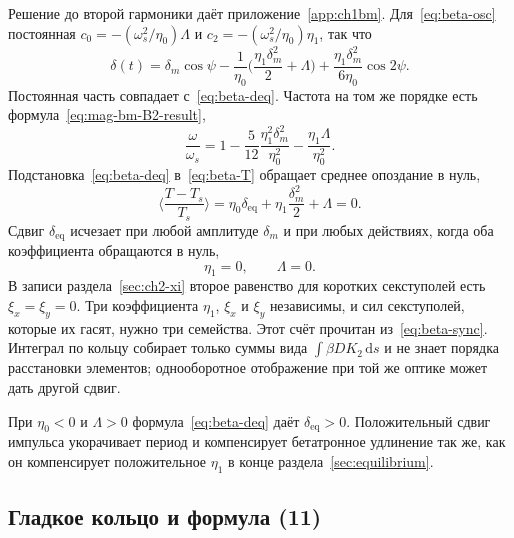 Решение до второй гармоники даёт приложение~\ref{app:ch1bm}. Для~\eqref{eq:beta-osc} постоянная $c_0=-(\omega_s^2/\eta_0)\Lambda$ и $c_2=-(\omega_s^2/\eta_0)\eta_1$, так что
\begin{equation}
\label{eq:beta-delta-sol}
\delta(t)
=\delta_m\cos\psi
-\frac{1}{\eta_0}
\Biggl(\frac{\eta_1\delta_m^2}{2}+\Lambda\Biggr)
+\frac{\eta_1\delta_m^2}{6\eta_0}\cos 2\psi.
\end{equation}
Постоянная часть совпадает с~\eqref{eq:beta-deq}. Частота на том же порядке есть формула~\eqref{eq:mag-bm-B2-result},
\begin{equation}
\label{eq:beta-freq}
\frac{\omega}{\omega_s}
=1-\frac{5}{12}\frac{\eta_1^2\delta_m^2}{\eta_0^2}
-\frac{\eta_1\Lambda}{\eta_0^2}.
\end{equation}
Подстановка~\eqref{eq:beta-deq} в~\eqref{eq:beta-T} обращает среднее опоздание в нуль,
\begin{equation}
\label{eq:beta-sync}
\Biggl\langle\frac{T-T_s}{T_s}\Biggr\rangle
=\eta_0\delta_{\mathrm{eq}}+\eta_1\frac{\delta_m^2}{2}+\Lambda
=0.
\end{equation}
Сдвиг $\delta_{\mathrm{eq}}$ исчезает при любой амплитуде $\delta_m$ и при любых действиях, когда оба коэффициента обращаются в нуль,
\begin{equation}
\label{eq:beta-comp}
\eta_1=0,
\qquad
\Lambda=0.
\end{equation}
В записи раздела~\ref{sec:ch2-xi} второе равенство для коротких секступолей есть $\xi_x=\xi_y=0$. Три коэффициента $\eta_1$, $\xi_x$ и $\xi_y$ независимы, и сил секступолей, которые их гасят, нужно три семейства. Этот счёт прочитан из~\eqref{eq:beta-sync}. Интеграл по кольцу собирает только суммы вида $\int\beta DK_2\,\mathrm{d}s$ и не знает порядка расстановки элементов; однооборотное отображение при той же оптике может дать другой сдвиг.

При $\eta_0<0$ и $\Lambda>0$ формула~\eqref{eq:beta-deq} даёт $\delta_{\mathrm{eq}}>0$. Положительный сдвиг импульса укорачивает период и компенсирует бетатронное удлинение так же, как он компенсирует положительное $\eta_1$ в конце раздела~\ref{sec:equilibrium}.

\subsection{Гладкое кольцо и формула (11)}
\label{sec:ch2-smooth}

